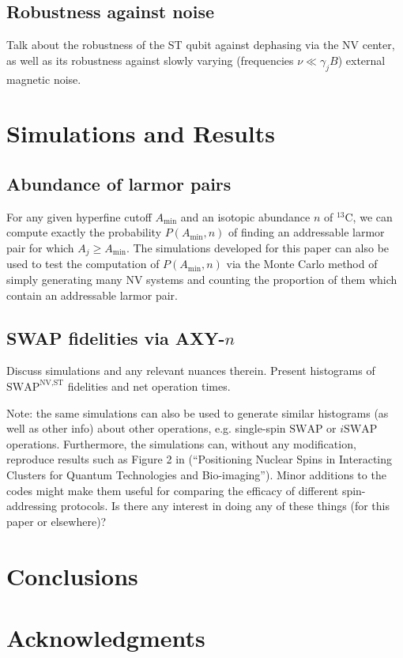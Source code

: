 \documentclass[twocolumn]{revtex4}
\renewcommand{\t}{\text} %
\newcommand{\p}[1]{\left(#1\right)} %
\newcommand{\SWAP}{\t{SWAP}}
\newcommand{\NV}{\t{NV}}
\newcommand{\ST}{\t{ST}}
\begin{document}
\subsection{Robustness against noise}

Talk about the robustness of the ST qubit against dephasing via the NV
center, as well as its robustness against slowly varying (frequencies
$\nu\ll\gamma_jB$) external magnetic noise.

\section{Simulations and Results}

\subsection{Abundance of larmor pairs}

For any given hyperfine cutoff $A_\t{min}$ and an isotopic abundance
$n$ of $^{13}$C, we can compute exactly the probability
$P\p{A_\t{min},n}$ of finding an addressable larmor pair for which
$A_j\ge A_\t{min}$. The simulations developed for this paper can also
be used to test the computation of $P\p{A_\t{min},n}$ via the Monte
Carlo method of simply generating many NV systems and counting the
proportion of them which contain an addressable larmor pair.

\subsection{SWAP fidelities via AXY-$n$}

Discuss simulations and any relevant nuances therein. Present
histograms of $\SWAP^{\NV,\ST}$ fidelities and net operation times.

Note: the same simulations can also be used to generate similar
histograms (as well as other info) about other operations,
e.g. single-spin $\SWAP$ or $i\SWAP$ operations. Furthermore, the
simulations can, without any modification, reproduce results such as
Figure 2 in \cite{wang2015positioning} (``Positioning Nuclear Spins in
Interacting Clusters for Quantum Technologies and
Bio-imaging''). Minor additions to the codes might make them useful
for comparing the efficacy of different spin-addressing protocols. Is
there any interest in doing any of these things (for this paper or
elsewhere)?

\section{Conclusions}

\section{Acknowledgments}

\footnotesize 
\end{document}
